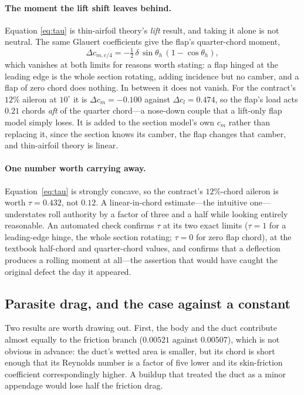 \documentclass[11pt,a4paper]{article}
\newcommand{\dg}{^\circ}
\begin{document}
\paragraph{The moment the lift shift leaves behind.} Equation
\eqref{eq:tau} is thin-airfoil theory's \emph{lift} result, and taking it
alone is not neutral. The same Glauert coefficients give the flap's
quarter-chord moment,
\begin{equation}
\Delta c_{m,c/4} = -\tfrac{1}{2}\,\delta\,\sin\theta_h\,
                    (1 - \cos\theta_h),
\label{eq:flapcm}
\end{equation}
which vanishes at both limits for reasons worth stating: a flap hinged at
the leading edge is the whole section rotating, adding incidence but no
camber, and a flap of zero chord does nothing. In between it does not
vanish. For the contract's $12\%$ aileron at $10\dg$ it is
$\Delta c_m = -0.100$ against $\Delta c_l = 0.474$, so the flap's load
acts $0.21$ chords \emph{aft} of the quarter chord---a nose-down couple
that a lift-only flap model simply loses. It is added to the section
model's own $c_m$ rather than replacing it, since the section knows its
camber, the flap changes that camber, and thin-airfoil theory is linear.

\paragraph{One number worth carrying away.} Equation~\eqref{eq:tau} is
strongly concave, so the contract's $12\%$-chord aileron is worth
$\tau = 0.432$, not $0.12$. A linear-in-chord estimate---the intuitive
one---understates roll authority by a factor of three and a half while
looking entirely reasonable. An automated check confirms $\tau$ at its
two exact limits ($\tau = 1$ for a leading-edge hinge, the whole section
rotating; $\tau = 0$ for zero flap chord), at the textbook half-chord
and quarter-chord values, and confirms that a deflection produces a rolling
moment at all---the assertion that would have caught the original defect
the day it appeared.

\subsection{Parasite drag, and the case against a constant}
\label{sec:parasiteresults}



\noindent
Two results are worth drawing out. First, the body and the duct
contribute almost equally to the friction branch ($0.00521$ against
$0.00507$), which is not obvious in advance: the duct's wetted area is
smaller, but its chord is short enough that its Reynolds number is a
factor of five lower and its skin-friction coefficient correspondingly
higher. A buildup that treated the duct as a minor appendage would lose
half the friction drag.
\end{document}
